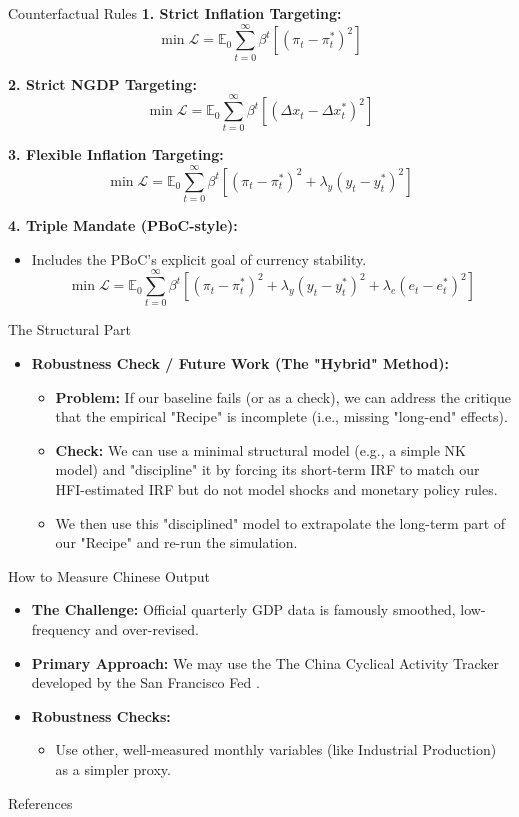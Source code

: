 \documentclass{beamer}
\begin{document}
\begin{frame}{Counterfactual Rules}
\textbf{1. Strict Inflation Targeting:}
\[
\min \mathcal{L} = \mathbb{E}_{0} \sum_{t=0}^{\infty} \beta^t \left[ (\pi_t - \pi_t^*)^2 \right]
\]

\textbf{2. Strict NGDP Targeting:}
\[
\min \mathcal{L} = \mathbb{E}_{0} \sum_{t=0}^{\infty} \beta^t \left[ (\Delta x_t - \Delta x_t^*)^2 \right]
\]

\textbf{3. Flexible Inflation Targeting:}
\[
\min \mathcal{L} = \mathbb{E}_{0} \sum_{t=0}^{\infty} \beta^t \left[ (\pi_t - \pi_t^*)^2 + \lambda_{y} (y_t - y_t^*)^2 \right]
\]

\textbf{4. Triple Mandate (PBoC-style):}
\begin{itemize}
    \item Includes the PBoC's explicit goal of currency stability.
    \[
    \min \mathcal{L} = \mathbb{E}_{0} \sum_{t=0}^{\infty} \beta^t \left[ (\pi_t - \pi_t^*)^2 + \lambda_{y} (y_t - y_t^*)^2 + \lambda_{e} (e_t - e_t^*)^2 \right]
    \]
\end{itemize}
\end{frame}


\begin{frame}{The Structural Part}
\begin{itemize}
    
    \item \textbf{Robustness Check / Future Work (The "Hybrid" Method):}
    \begin{itemize}
        \item \textbf{Problem:} If our baseline fails (or as a check), we can address the critique that the empirical "Recipe" is incomplete (i.e., missing "long-end" effects).
        \item \textbf{Check:} We can use a minimal structural model (e.g., a simple NK model) and "discipline" it by forcing its short-term IRF to match our HFI-estimated IRF but do not model shocks and monetary policy rules.
        \item We then use this "disciplined" model to extrapolate the long-term part of our "Recipe" and re-run the simulation.
    \end{itemize}
\end{itemize}
\end{frame}

\begin{frame}{How to Measure Chinese Output}
\begin{itemize}
    \item \textbf{The Challenge:} Official quarterly GDP data is famously smoothed, low-frequency and over-revised.
    \item \textbf{Primary Approach:} We may use the The China Cyclical Activity Tracker developed by the San Francisco Fed \parencite{FernaldHsuSpiegel2021}.
    \item \textbf{Robustness Checks:}
    \begin{itemize}
        \item Use other, well-measured monthly variables (like Industrial Production) as a simpler proxy.
    \end{itemize}
\end{itemize}
\end{frame}

\begin{frame}[allowframebreaks]{References}
    
    \printbibliography
\end{frame}
\end{document}

